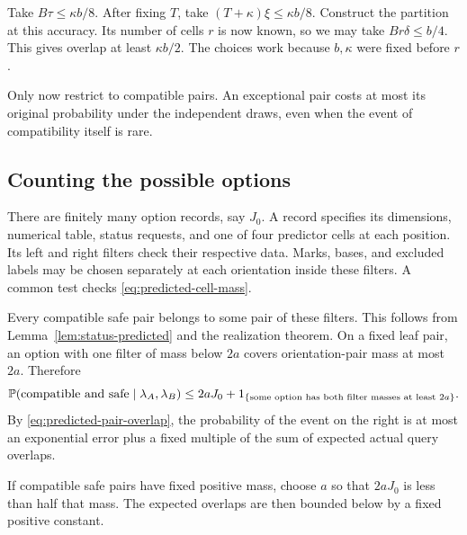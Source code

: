 Take \(B\tau\le\kappa b/8\). After fixing \(T\), take
\((T+\kappa)\xi\le\kappa b/8\). Construct the partition at this
accuracy. Its number of cells \(r\) is now known, so we may take
\(Br\delta\le b/4\). This gives overlap at least \(\kappa b/2\).
The choices work because \(b,\kappa\) were fixed before \(r\).

Only now restrict to compatible pairs. An exceptional pair costs at
most its original probability under the independent draws, even when
the event of compatibility itself is rare.

\subsection{Counting the possible options}

There are finitely many option records, say \(J_0\). A record specifies
its dimensions, numerical table, status requests, and one of four
predictor cells at each position. Its left and right filters check their
respective data. Marks, bases, and excluded labels may be chosen separately
at each orientation inside these filters. A common test checks
\eqref{eq:predicted-cell-mass}.

Every compatible safe pair belongs to some pair of these filters.
This follows from Lemma~\ref{lem:status-predicted} and the realization theorem.
On a fixed leaf pair, an option with one filter of mass below \(2a\)
covers orientation-pair mass at most \(2a\). Therefore
\begin{equation}\label{eq:predicted-finite-count}
 \mathbb P(\text{compatible and safe}\mid\lambda_A,\lambda_B)
 \le2aJ_0+
  1_{\{\text{some option has both filter masses at least }2a\}}.
\end{equation}
By \eqref{eq:predicted-pair-overlap}, the probability of the event on the
right is at most an exponential error plus a fixed multiple of the sum
of expected actual query overlaps.

If compatible safe pairs have fixed positive mass, choose \(a\) so that
\(2aJ_0\) is less than half that mass. The expected overlaps are then
bounded below by a fixed positive constant.


